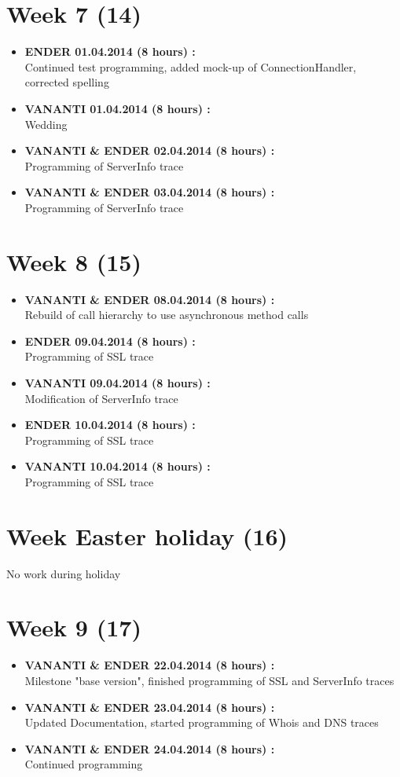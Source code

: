 \documentclass[
	a4paper,					10pt,							twoside,					openright,				notitlepage,			parskip=half,			]{scrreprt}
\begin{document}
\section*{Week 7 (14)}
\label{sec:worklog_07}
\begin{itemize}
\item{\textbf{ENDER 01.04.2014 (8 hours) :} \\  Continued test programming, added mock-up of ConnectionHandler, corrected spelling}
\item{\textbf{VANANTI 01.04.2014 (8 hours) :} \\  Wedding}
\item{\textbf{VANANTI \& ENDER 02.04.2014 (8 hours) :} \\  Programming of ServerInfo trace}
\item{\textbf{VANANTI \& ENDER 03.04.2014 (8 hours) :} \\  Programming of ServerInfo trace}
\end{itemize}
\section*{Week 8 (15)}
\label{sec:worklog_08}
\begin{itemize}
\item{\textbf{VANANTI \& ENDER 08.04.2014 (8 hours) :} \\  Rebuild of call hierarchy to use asynchronous method calls}
\item{\textbf{ENDER 09.04.2014 (8 hours) :} \\  Programming of SSL trace}
\item{\textbf{VANANTI 09.04.2014 (8 hours) :} \\  Modification of ServerInfo trace}
\item{\textbf{ENDER 10.04.2014 (8 hours) :} \\  Programming of SSL trace}
\item{\textbf{VANANTI 10.04.2014 (8 hours) :} \\  Programming of SSL trace}
\end{itemize}
\section*{Week Easter holiday (16)}
\label{sec:worklog_08a}
No work during holiday
\section*{Week 9 (17)}
\label{sec:worklog_09}
\begin{itemize}
\item{\textbf{VANANTI \& ENDER 22.04.2014 (8 hours) :} \\  Milestone "base version", finished programming of SSL and ServerInfo traces}
\item{\textbf{VANANTI \& ENDER 23.04.2014 (8 hours) :} \\  Updated Documentation, started programming of Whois and DNS traces}
\item{\textbf{VANANTI \& ENDER 24.04.2014 (8 hours) :} \\  Continued programming}
\end{itemize}
\end{document}
